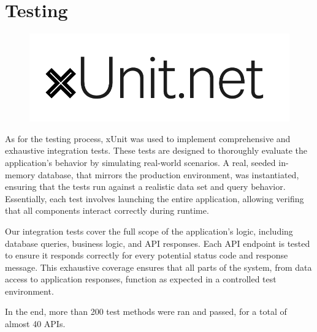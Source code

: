 \chapter{Testing}

\begin{figure}[H]
    \hfill
    \includegraphics[width=0.2\linewidth]{../assets/tools-logos/xunit.png}
    \hspace{1cm}
\end{figure}

As for the testing process, xUnit was used to implement comprehensive and exhaustive integration tests.
These tests are designed to thoroughly evaluate the application’s behavior by simulating real-world scenarios.
A real, seeded in-memory database, that mirrors the production environment, was instantiated, ensuring that the tests run against a realistic data set and query behavior.
Essentially, each test involves launching the entire application, allowing verifing that all components interact correctly during runtime.

Our integration tests cover the full scope of the application’s logic, including database queries, business logic, and API responses.
Each API endpoint is tested to ensure it responds correctly for every potential status code and response message.
This exhaustive coverage ensures that all parts of the system, from data access to application responses, function as expected in a controlled test environment.

In the end, more than 200 test methods were ran and passed, for a total of almost 40 APIs.

